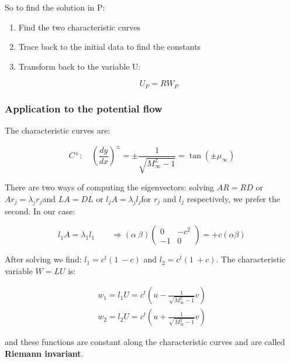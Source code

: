 	So to find the solution in P: 
	
	\begin{enumerate}
	\item Find the two characteristic curves
	\item Trace back to the initial data to find the constants
	\item Transform back to the variable U: 
	
	\begin{equation}
	U_P = RW_P
	\end{equation}
	\end{enumerate}
	
\subsubsection{Application to the potential flow}
	The characteristic curves are: 
	
	\begin{equation}
	C^\pm: \quad \left(\frac{dy}{dx}\right)^\pm = \pm \frac{1}{\sqrt{M^2_\infty -1}} = \tan (\pm \mu _\infty) 
	\end{equation}
	
	There are two ways of computing the eigenvectors: solving $AR = RD$  or $Ar_j = \lambda _jr_j $and $LA = DL$ or $l_jA = \lambda _jl_j $for $r_j$ and $l_j$ respectively, we prefer the second. In our case: 
	
	\begin{equation}
	l_1 A = \lambda _1 l_1 \qquad \Rightarrow (\alpha \ \beta) \left(
	\begin{array}{cc}
	0 & -c^2\\
	-1 & 0
	\end{array}
	\right)
	= +c (\alpha \beta)
	\end{equation}
	
	After solving we find: $l_1 = c^t(1 \ -c)$ and $l_2 = c^t(1 \ +c)$. The characteristic variable $W = LU$ is: 
	
	\begin{equation}
	\begin{aligned}
	w_1 = l_1 U = c^t (u  -\frac{1}{\sqrt{M_\infty^2 -1}} v)\\
	w_2 = l_2 U = c^t (u  +\frac{1}{\sqrt{M_\infty^2 -1}} v)
	\end{aligned}
	\end{equation}
	
	and these functions are constant along the characteristic curves and are called \textbf{Riemann invariant}. 
	
